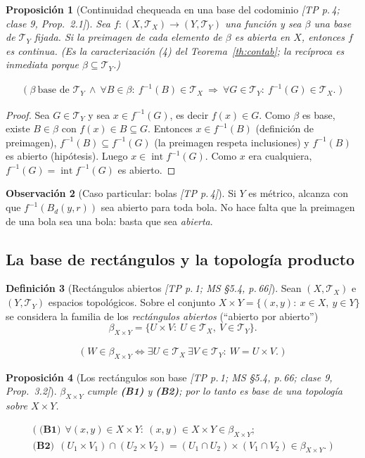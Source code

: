 \documentclass[11pt,a4paper]{article}
\newcommand{\lgc}[1]{\par\vspace{-3pt}\begin{gather*}\big(\;#1\;\big)\end{gather*}\vspace{-6pt}}
\theoremstyle{definition}
\newtheorem{definicion}{Definición}[section]
\newtheorem{observacion}[definicion]{Observación}
\theoremstyle{plain}
\newtheorem{proposicion}[definicion]{Proposición}
\newcommand{\fnt}[1]{{\normalfont\small\itshape\color{gray!150!black}[#1]}}
\newcommand{\intr}{\operatorname{int}}
\newcommand{\Bola}[2]{B_d(#1,#2)}
\newcommand{\tp}{\mathcal{T}}
\begin{document}
\begin{proposicion}[Continuidad chequeada en una base del codominio \fnt{TP p.\,4; clase 9, Prop.\ 2.1}]\label{pr:contbase}
Sea $f:(X,\tp_X)\to(Y,\tp_Y)$ una función y sea $\beta$ una base de $\tp_Y$ fijada. Si la preimagen de cada elemento de $\beta$ es abierta en $X$, entonces $f$ es continua. (Es la caracterización (4) del Teorema~\ref{th:contab}; la recíproca es inmediata porque $\beta\subseteq\tp_Y$.)
\lgc{\beta\ \text{base de }\tp_Y\ \wedge\ \forall B\in\beta:\ f^{-1}(B)\in\tp_X\ \Longrightarrow\ \forall G\in\tp_Y:\ f^{-1}(G)\in\tp_X.}
\end{proposicion}

\begin{proof}
Sea $G\in\tp_Y$ y sea $x\in f^{-1}(G)$, es decir $f(x)\in G$. Como $\beta$ es base, existe $B\in\beta$ con $f(x)\in B\subseteq G$. Entonces $x\in f^{-1}(B)$ (definición de preimagen), $f^{-1}(B)\subseteq f^{-1}(G)$ (la preimagen respeta inclusiones) y $f^{-1}(B)$ es abierto (hipótesis). Luego $x\in\intr f^{-1}(G)$. Como $x$ era cualquiera, $f^{-1}(G)=\intr f^{-1}(G)$ es abierto.
\end{proof}

\begin{observacion}[Caso particular: bolas \fnt{TP p.\,4}]
Si $Y$ es métrico, alcanza con que $f^{-1}(\Bola{y}{r})$ sea abierto para toda bola. No hace falta que la preimagen de una bola sea una bola: basta que sea \emph{abierta}.
\end{observacion}

\subsection{La base de rectángulos y la topología producto}

\begin{definicion}[Rectángulos abiertos \fnt{TP p.\,1; MS \S5.4, p.\,66}]
Sean $(X,\tp_X)$ e $(Y,\tp_Y)$ espacios topológicos. Sobre el conjunto $X\times Y=\{(x,y):\ x\in X,\ y\in Y\}$ se considera la familia de los \emph{rectángulos abiertos} (``abierto por abierto'')
\[
\beta_{X\times Y}=\{U\times V:\ U\in\tp_X,\ V\in\tp_Y\}.
\]
\lgc{W\in\beta_{X\times Y}\iff \exists U\in\tp_X\ \exists V\in\tp_Y:\ W=U\times V.}
\end{definicion}

\begin{proposicion}[Los rectángulos son base \fnt{TP p.\,1; MS \S5.4, p.\,66; clase 9, Prop.\ 3.2}]\label{pr:rectbase}
$\beta_{X\times Y}$ cumple \textbf{(B1)} y \textbf{(B2)}; por lo tanto es base de una topología sobre $X\times Y$.
\lgc{\textbf{(B1)}\ \ \forall (x,y)\in X\times Y:\ (x,y)\in X\times Y\in\beta_{X\times Y};\\
\textbf{(B2)}\ \ (U_1\times V_1)\cap(U_2\times V_2)=(U_1\cap U_2)\times(V_1\cap V_2)\in\beta_{X\times Y}.}
\end{proposicion}
\end{document}
